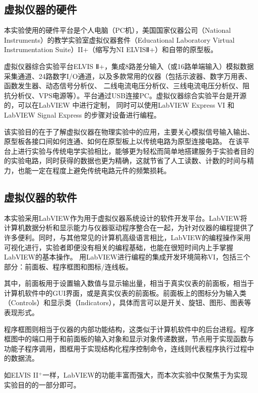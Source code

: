 \documentclass[UTF-8,twoside,cs4size]{ctexart}
\begin{document}
    \subsection{虚拟仪器的硬件}
    本实验使用的硬件平台是个人电脑（PC机），美国国家仪器公司（National Instruments）的教学实验室虚拟仪器套件（Educational Laboratory Virtual Instrumentation Suite）II+（缩写为NI ELVISⅡ+）和自带的原型板。\par
虚拟仪器综合实验平台ELVIS Ⅱ+，集成8路差分输入（或16路单端输入）模拟数据采集通道、24路数字I/O通道，以及多款常用的仪器（包括示波器、数字万用表、函数发生器、动态信号分析仪、
二线电流电压分析仪、三线电流电压分析仪、阻抗分析仪、VPS电源等）。平台通过USB连接PC。虚拟仪器综合实验平台是开源的，可以在LabVIEW 中进行定制，
同时可以使用LabVIEW Express VI 和LabVIEW Signal Express 的步骤对设备进行编程。\par
    该实验目的在于了解虚拟仪器在物理实验中的应用，主要关心模拟信号输入输出、原型板各接口间如何连通、如何在原型板上以传统电路为原型连接电路。
在该平台上进行实验与传统电学实验相比，能够更为轻松而简单地搭建服务于实验者目的的实验电路，同时获得的数据也更为精确，这就节省了人工读数、计数的时间与精力，也能一定在程度上避免传统电路元件的频繁损耗。
    \subsection{虚拟仪器的软件}
    本实验采用LabVIEW作为用于虚拟仪器系统设计的软件开发平台。LabVIEW将计算机数据分析和显示能力与仪器驱动程序整合在一起，为针对仪器的编程提供了许多便利。同时，与其他常见的计算机高级语言相比，LabVIEW的编程操作采用可视化进行，实验者即便没有相关的编程基础，也能在很短时间内上手掌握LabVIEW的基本操作。
	用LabVIEW进行编程的集成开发环境简称VI，包括三个部分：前面板、程序框图和图标/连线板。
	
	其中，前面板用于设置输入数值与显示输出量，相当于真实仪表的前面板，相当于计算机软件中的GUI界面，或是真实仪表的前面板。前面板上的图标分为输入类（Controls）和显示类（Indicators），具体而言可以是开关、旋钮、图形、图表等表现形式。
	
	程序框图则相当于仪器的内部功能结构，这类似于计算机软件中的后台进程。程序框图中的端口用于和前面板的输入对象和显示对象传递数据，节点用于实现函数与功能子程序调用，图框用于实现结构化程序控制命令，连线则代表程序执行过程中的数据流。
	
	如ELVIS II$ ^+ $一样，LabVIEW的功能丰富而强大，而本次实验中仅聚焦于为实现实验目的的一部分即可。
\end{document}
